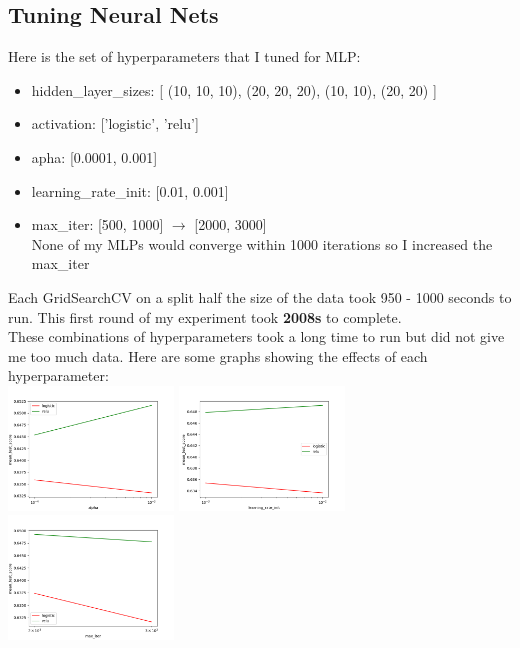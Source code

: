 \documentclass[12pt]{article}
\begin{document}
\subsection{Tuning Neural Nets}
Here is the set of hyperparameters that I tuned for MLP:
\begin{itemize}
    \item hidden\_layer\_sizes: [ (10, 10, 10), (20, 20, 20), (10, 10), (20, 20) ]
    \item activation: ['logistic', 'relu']
    \item apha: [0.0001, 0.001]
    \item learning\_rate\_init: [0.01, 0.001]
    \item max\_iter: [500, 1000] $\rightarrow$ [2000, 3000]
    \\ None of my MLPs would converge within 1000 iterations so I increased the max\_iter
\end{itemize}
Each GridSearchCV on a split half the size of the data took 950 - 1000 seconds to run. This first round of my experiment took \textbf{2008s} to complete. \\
These combinations of hyperparameters took a long time to run but did not give me too much data. Here are some graphs showing the effects of each hyperparameter: \\
\includegraphics[width=0.33\textwidth]{MLP_alpha_line.png}
\includegraphics[width=0.33\textwidth]{MLP_learning_rate_init_line.png}
\includegraphics[width=0.33\textwidth]{MLP_max_iter_line.png}
\end{document}
